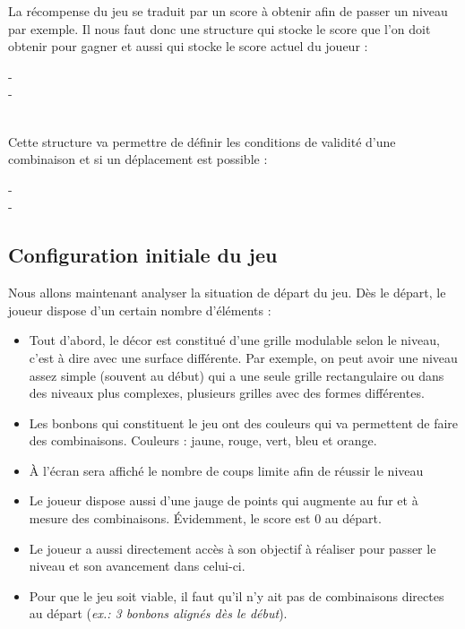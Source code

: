   La récompense du jeu se traduit par un score à obtenir afin de passer un niveau par exemple.
  Il nous faut donc une structure qui stocke le score que l'on doit obtenir pour gagner et aussi qui stocke le score actuel du joueur : \\
  
  \begin{typeag}[Score]
 -       \\
 -       
  \end{typeag}	\\
  
  Cette structure va permettre de définir les conditions de validité d'une combinaison et si un déplacement est possible : \\
  
\begin{typeag}[Case]
 -       \\
 -       
  \end{typeag}

\subsection{Configuration initiale du jeu}
Nous allons maintenant analyser la situation de départ du jeu. Dès le départ, le joueur dispose d'un certain nombre d'éléments : \\

\begin{itemize}

\item
	Tout d'abord, le décor est constitué d'une grille modulable selon le niveau, c'est à dire avec une surface différente.
	Par exemple, on peut avoir une niveau assez simple (souvent au début) qui a une seule grille rectangulaire ou dans des niveaux plus complexes, plusieurs grilles avec des formes différentes.
\item
	Les bonbons qui constituent le jeu ont des couleurs qui va permettent de faire des combinaisons.
	Couleurs : jaune, rouge, vert, bleu et orange.
\item
	À l'écran sera affiché le nombre de coups limite afin de réussir le niveau %
\item
	Le joueur dispose aussi d'une jauge de points qui augmente au fur et à mesure des combinaisons.
	Évidemment, le score est 0 au départ.
\item
	Le joueur a aussi directement accès à son objectif à réaliser pour passer le niveau et son avancement dans celui-ci.
\item 
 	Pour que le jeu soit viable, il faut qu'il n'y ait pas de combinaisons directes au départ (\emph{ex.: 3 bonbons alignés dès le début}). %
	
\end{itemize}

